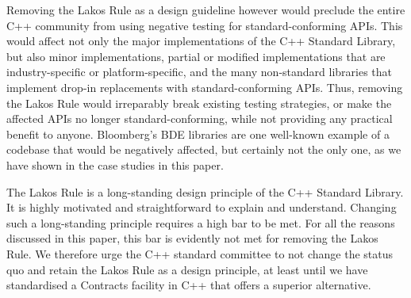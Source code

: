 Removing the Lakos Rule as a design guideline however would preclude the entire C++ community from using negative testing for standard-conforming APIs. This would affect not only the major implementations of the C++ Standard Library, but also minor implementations, partial or modified implementations that are industry-specific or platform-specific, and the many non-standard libraries that implement drop-in replacements with standard-conforming APIs. Thus, removing the Lakos Rule would irreparably break existing testing strategies, or make the affected APIs no longer standard-conforming, while not providing any practical benefit to anyone. Bloomberg's BDE libraries are one well-known example of a codebase that would be negatively affected, but certainly not the only one, as we have shown in the case studies in this paper. 

The Lakos Rule is a long-standing design principle of the C++ Standard Library. It is highly motivated and straightforward to explain and understand. Changing such a long-standing principle requires a high bar to be met. For all the reasons discussed in this paper, this bar is evidently not met for removing the Lakos Rule. We therefore urge the C++ standard committee to not change the status quo and retain the Lakos Rule as a design principle, at least until we have standardised a Contracts facility in C++ that offers a superior alternative.





\renewcommand{\bibname}{References}



